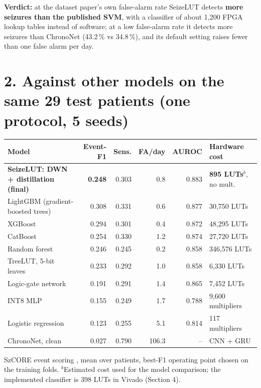 \documentclass[10pt,a4paper,landscape]{article}
\begin{document}
\vspace{4pt}
\textbf{Verdict:} at the dataset paper's own false-alarm rate SeizeLUT detects \textbf{more seizures than the
published SVM}, with a classifier of about 1,200 FPGA lookup tables instead of software; at a low false-alarm rate it
detects more seizures than ChronoNet (43.2\,\% vs 34.8\,\%), and its default setting raises fewer than one false alarm
per day.

\newpage
\section*{2. Against other models on the same 29 test patients (one protocol, 5 seeds)}

\begin{minipage}[t]{0.60\textwidth}
\vspace{0pt}
\small
\begin{tabularx}{\textwidth}{@{}LrrrrP{24mm}@{}}
\toprule
\textbf{Model} & \textbf{Event-F1} & \textbf{Sens.} & \textbf{FA/day} & \textbf{AUROC} & \textbf{Hardware cost}\\
\midrule
\textbf{SeizeLUT: DWN + distillation (final)} & \textbf{0.248} & 0.303 & 0.8 & 0.883 & \textbf{895 LUTs}$^{b}$, no mult.\\
LightGBM (gradient-boosted trees) & 0.308 & 0.331 & 0.6 & 0.877 & 30,750 LUTs\\
XGBoost & 0.294 & 0.301 & 0.4 & 0.872 & 48,295 LUTs\\
CatBoost & 0.254 & 0.330 & 1.2 & 0.874 & 27,720 LUTs\\
Random forest & 0.246 & 0.245 & 0.2 & 0.858 & 346,576 LUTs\\
TreeLUT, 5-bit leaves \cite{khataei2025treelut} & 0.233 & 0.292 & 1.0 & 0.858 & 6,330 LUTs\\
Logic-gate network \cite{petersen2022dlgn} & 0.191 & 0.291 & 1.4 & 0.865 & 7,452 LUTs\\
INT8 MLP & 0.155 & 0.249 & 1.7 & 0.788 & 9,600 multipliers\\
Logistic regression & 0.123 & 0.255 & 5.1 & 0.814 & 117 multipliers\\
ChronoNet, clean \cite{roy2019chrononet} & 0.027 & 0.790 & 106.3 & -- & CNN + GRU\\
\bottomrule
\end{tabularx}

\vspace{3pt}
{\footnotesize SzCORE event scoring \cite{dan2024szcore}, mean over patients, best-F1 operating point chosen on the
training folds. $^{b}$Estimated cost used for the model comparison; the implemented classifier is 398 LUTs in Vivado
(Section 4).}
\end{minipage}\hfill
\end{document}
